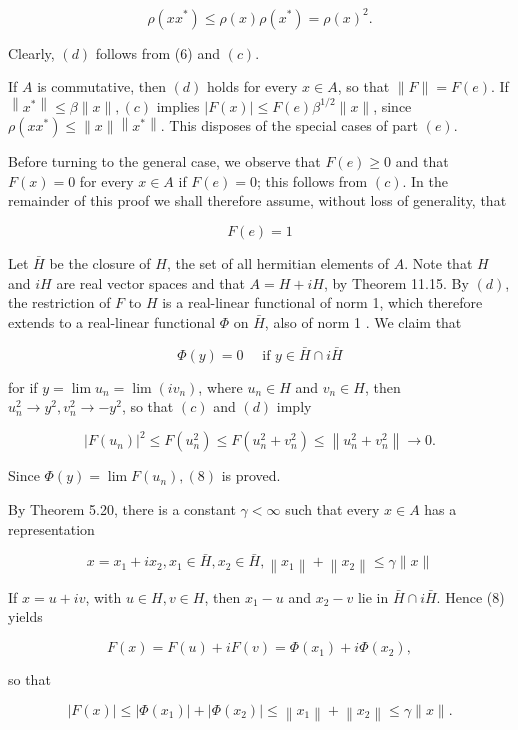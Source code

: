\documentclass[10pt]{article}
\begin{document}
$$
\rho\left(x x^{*}\right) \leq \rho(x) \rho\left(x^{*}\right)=\rho(x)^{2} .
$$

Clearly, $(d)$ follows from (6) and $(c)$.

If $A$ is commutative, then $(d)$ holds for every $x \in A$, so that $\|F\|=F(e)$. If $\left\|x^{*}\right\| \leq \beta\|x\|,(c)$ implies $|F(x)| \leq F(e) \beta^{1 / 2}\|x\|$, since $\rho\left(x x^{*}\right) \leq\|x\|\left\|x^{*}\right\|$. This disposes of the special cases of part $(e)$.

Before turning to the general case, we observe that $F(e) \geq 0$ and that $F(x)=0$ for every $x \in A$ if $F(e)=0$; this follows from $(c)$. In the remainder of this proof we shall therefore assume, without loss of generality, that

$$
F(e)=1
$$

Let $\bar{H}$ be the closure of $H$, the set of all hermitian elements of $A$. Note that $H$ and $i H$ are real vector spaces and that $A=H+i H$, by Theorem 11.15. By $(d)$, the restriction of $F$ to $H$ is a real-linear functional of norm 1, which therefore extends to a real-linear functional $\Phi$ on $\bar{H}$, also of norm 1 . We claim that

$$
\Phi(y)=0 \quad \text { if } y \in \bar{H} \cap i \bar{H}
$$

for if $y=\lim u_{n}=\lim \left(i v_{n}\right)$, where $u_{n} \in H$ and $v_{n} \in H$, then $u_{n}^{2} \rightarrow y^{2}, v_{n}^{2} \rightarrow-y^{2}$, so that $(c)$ and $(d)$ imply

$$
\left|F\left(u_{n}\right)\right|^{2} \leq F\left(u_{n}^{2}\right) \leq F\left(u_{n}^{2}+v_{n}^{2}\right) \leq\left\|u_{n}^{2}+v_{n}^{2}\right\| \rightarrow 0 .
$$

Since $\Phi(y)=\lim F\left(u_{n}\right),(8)$ is proved.

By Theorem 5.20, there is a constant $\gamma<\infty$ such that every $x \in A$ has a representation

$$
x=x_{1}+i x_{2}, x_{1} \in \bar{H}, x_{2} \in \bar{H},\left\|x_{1}\right\|+\left\|x_{2}\right\| \leq \gamma\|x\|
$$

If $x=u+i v$, with $u \in H, v \in H$, then $x_{1}-u$ and $x_{2}-v$ lie in $\bar{H} \cap i \bar{H}$. Hence (8) yields

$$
F(x)=F(u)+i F(v)=\Phi\left(x_{1}\right)+i \Phi\left(x_{2}\right),
$$

so that

$$
|F(x)| \leq\left|\Phi\left(x_{1}\right)\right|+\left|\Phi\left(x_{2}\right)\right| \leq\left\|x_{1}\right\|+\left\|x_{2}\right\| \leq \gamma\|x\| .
$$
\end{document}
